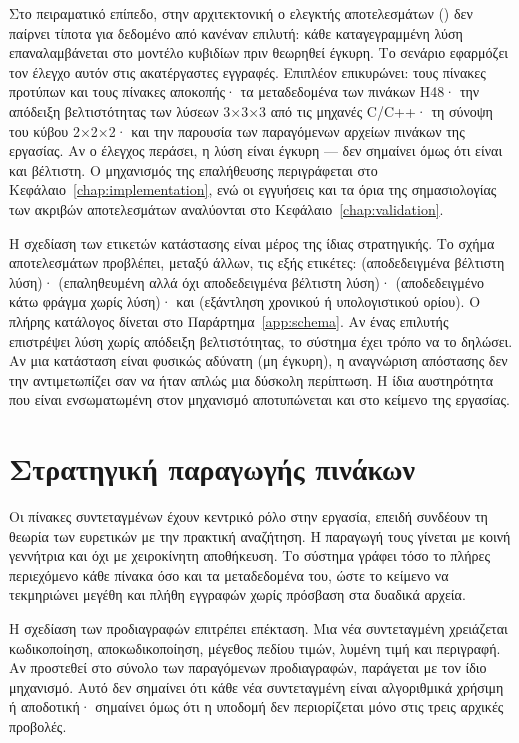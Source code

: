 Στο πειραματικό επίπεδο, στην αρχιτεκτονική ο ελεγκτής αποτελεσμάτων () δεν παίρνει τίποτα για δεδομένο από κανέναν επιλυτή: κάθε καταγεγραμμένη λύση επαναλαμβάνεται στο μοντέλο κυβιδίων πριν θεωρηθεί έγκυρη. Το σενάριο  εφαρμόζει τον έλεγχο αυτόν στις ακατέργαστες εγγραφές. Επιπλέον επικυρώνει: τους πίνακες προτύπων και τους πίνακες αποκοπής· τα μεταδεδομένα των πινάκων H48· την απόδειξη βελτιστότητας των λύσεων 3×3×3 από τις μηχανές C/C++· τη σύνοψη του κύβου 2×2×2· και την παρουσία των παραγόμενων αρχείων πινάκων της εργασίας. Αν ο έλεγχος περάσει, η λύση είναι έγκυρη — δεν σημαίνει όμως ότι είναι και βέλτιστη. Ο μηχανισμός της επαλήθευσης περιγράφεται στο Κεφάλαιο~\ref{chap:implementation}, ενώ οι εγγυήσεις και τα όρια της σημασιολογίας των ακριβών αποτελεσμάτων αναλύονται στο Κεφάλαιο~\ref{chap:validation}.

Η σχεδίαση των ετικετών κατάστασης είναι μέρος της ίδιας στρατηγικής. Το σχήμα αποτελεσμάτων προβλέπει, μεταξύ άλλων, τις εξής ετικέτες:  (αποδεδειγμένα βέλτιστη λύση)·  (επαληθευμένη αλλά όχι αποδεδειγμένα βέλτιστη λύση)·  (αποδεδειγμένο κάτω φράγμα χωρίς λύση)· και  (εξάντληση χρονικού ή υπολογιστικού ορίου). Ο πλήρης κατάλογος δίνεται στο Παράρτημα~\ref{app:schema}. Αν ένας επιλυτής επιστρέψει λύση χωρίς απόδειξη βελτιστότητας, το σύστημα έχει τρόπο να το δηλώσει. Αν μια κατάσταση είναι φυσικώς αδύνατη (μη έγκυρη), η αναγνώριση απόστασης δεν την αντιμετωπίζει σαν να ήταν απλώς μια δύσκολη περίπτωση. Η ίδια αυστηρότητα που είναι ενσωματωμένη στον μηχανισμό αποτυπώνεται και στο κείμενο της εργασίας.

\section{Στρατηγική παραγωγής πινάκων}
\label{sec:design-tables}
Οι πίνακες συντεταγμένων έχουν κεντρικό ρόλο στην εργασία, επειδή συνδέουν τη θεωρία των ευρετικών με την πρακτική αναζήτηση. Η παραγωγή τους γίνεται με κοινή γεννήτρια και όχι με χειροκίνητη αποθήκευση. Το σύστημα γράφει τόσο το πλήρες περιεχόμενο κάθε πίνακα όσο και τα μεταδεδομένα του, ώστε το κείμενο να τεκμηριώνει μεγέθη και πλήθη εγγραφών χωρίς πρόσβαση στα δυαδικά αρχεία.

Η σχεδίαση των προδιαγραφών επιτρέπει επέκταση. Μια νέα συντεταγμένη χρειάζεται κωδικοποίηση, αποκωδικοποίηση, μέγεθος πεδίου τιμών, λυμένη τιμή και περιγραφή. Αν προστεθεί στο σύνολο των παραγόμενων προδιαγραφών, παράγεται με τον ίδιο μηχανισμό. Αυτό δεν σημαίνει ότι κάθε νέα συντεταγμένη είναι αλγοριθμικά χρήσιμη ή αποδοτική· σημαίνει όμως ότι η υποδομή δεν περιορίζεται μόνο στις τρεις αρχικές προβολές.

